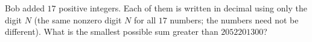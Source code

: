 Bob added $17$ positive integers. Each of them is written in decimal using only the digit $N$ (the same nonzero digit $N$ for all $17$ numbers; the numbers need not be different). What is the smallest possible sum greater than $2052201300$?
